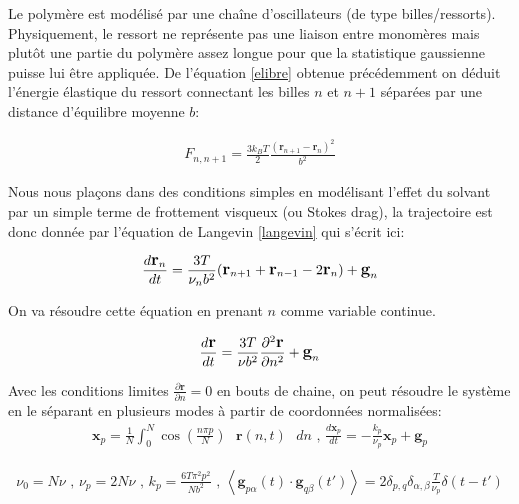 \documentclass[a4paper,11pt]{article}
\begin{document}
Le polymère est modélisé par une chaîne d'oscillateurs (de type billes/ressorts). Physiquement, le ressort ne représente pas une liaison entre monomères mais plutôt une partie du polymère assez longue pour que la statistique gaussienne puisse lui être appliquée. De l'équation \ref{elibre} obtenue précédemment on déduit l'énergie élastique du ressort connectant les billes $n$ et $n+1$ séparées par une distance d'équilibre moyenne $b$:


\begin{eqnarray}
F_{n,n+1} = \frac{3 k_B T}{2} \frac{(\textbf{r}_{n+1}-\textbf{r}_n)^2}{b^2}
\end{eqnarray}

Nous nous plaçons dans des conditions simples en modélisant l'effet du solvant par un simple terme de frottement visqueux (ou Stokes drag), la trajectoire est donc donnée par l'équation de Langevin \ref{langevin} qui s'écrit ici:

\begin{eqnarray}
\large{
\frac{d \textbf{r}_n}{dt} =  \frac{3T}{\nu_n b^2}( \textbf{r}_{n+1} +\textbf{r}_{n-1} -2\textbf{r}_n )  + \textbf{g}_n}
\end{eqnarray}

On va résoudre cette équation en prenant $n$ comme variable continue.

\begin{eqnarray}
\large{
\frac{d \textbf{r}}{dt} =  \frac{3T}{\nu b^2}\frac{\partial ^2 \textbf{r}}{\partial  n^2} + \textbf{g}_n}
\end{eqnarray}

Avec les conditions limites $\frac{\partial  \textbf{r}}{\partial  n}=0$ en bouts de chaine, on peut résoudre le système en le séparant en plusieurs modes à  partir de coordonnées normalisées: 
\begin{eqnarray}
\textbf{x}_p= \frac{1}{N} \int_0^N \cos \left(\frac{n\pi p}{N}\right) \text{ }\textbf{r}(n,t)\text{ } dn \text{ , } \frac{d \textbf{x}_p}{dt} =  -\frac{k_p}{\nu _p} \textbf{x}_p + \textbf{g}_p
\end{eqnarray}



\begin{eqnarray}
\nu_0=  N \nu \text{ , } \nu_p= 2 N \nu  \text{ , }  k_p=\frac{6T\pi^2 p^2}{N b^2}  \text{ , }  \left<\textbf{g}_{p\alpha}(t) \cdot \textbf{g}_{q\beta}(t')\right> = 2\delta_{p,q} \delta_{\alpha ,\beta} \frac{T}{\nu_p} \delta(t-t')
\end{eqnarray}
\end{document}
